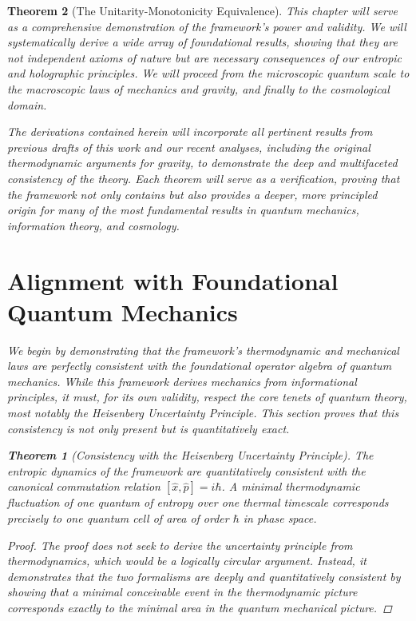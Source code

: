 \documentclass[11pt, letterpaper]{report}
\theoremstyle{plain} %
\newtheorem{theorem}{Theorem}[chapter]
\theoremstyle{definition} %
\theoremstyle{remark} %
\begin{document}
\begin{theorem}[The Unitarity-Monotonicity Equivalence]
This chapter will serve as a comprehensive demonstration of the framework's power and validity. We will systematically derive a wide array of foundational results, showing that they are not independent axioms of nature but are necessary consequences of our entropic and holographic principles. We will proceed from the microscopic quantum scale to the macroscopic laws of mechanics and gravity, and finally to the cosmological domain.

The derivations contained herein will incorporate all pertinent results from previous drafts of this work and our recent analyses, including the original thermodynamic arguments for gravity, to demonstrate the deep and multifaceted consistency of the theory. Each theorem will serve as a verification, proving that the framework not only contains but also provides a deeper, more principled origin for many of the most fundamental results in quantum mechanics, information theory, and cosmology.

\section{Alignment with Foundational Quantum Mechanics}
\label{sec:verify_qm}

We begin by demonstrating that the framework’s thermodynamic and mechanical laws are perfectly consistent with the foundational operator algebra of quantum mechanics. While this framework derives mechanics from informational principles, it must, for its own validity, respect the core tenets of quantum theory, most notably the Heisenberg Uncertainty Principle. This section proves that this consistency is not only present but is quantitatively exact.

\begin{theorem}[Consistency with the Heisenberg Uncertainty Principle]
\label{thm:verify_hup}
The entropic dynamics of the framework are quantitatively consistent with the canonical commutation relation $[\hat{x}, \hat{p}] = i\hbar$. A minimal thermodynamic fluctuation of one quantum of entropy over one thermal timescale corresponds precisely to one quantum cell of area of order $\hbar$ in phase space.
\end{theorem}
\begin{proof}
The proof does not seek to derive the uncertainty principle from thermodynamics, which would be a logically circular argument. Instead, it demonstrates that the two formalisms are deeply and quantitatively consistent by showing that a minimal conceivable event in the thermodynamic picture corresponds exactly to the minimal area in the quantum mechanical picture.


\end{proof}
\end{theorem}
\end{document}
